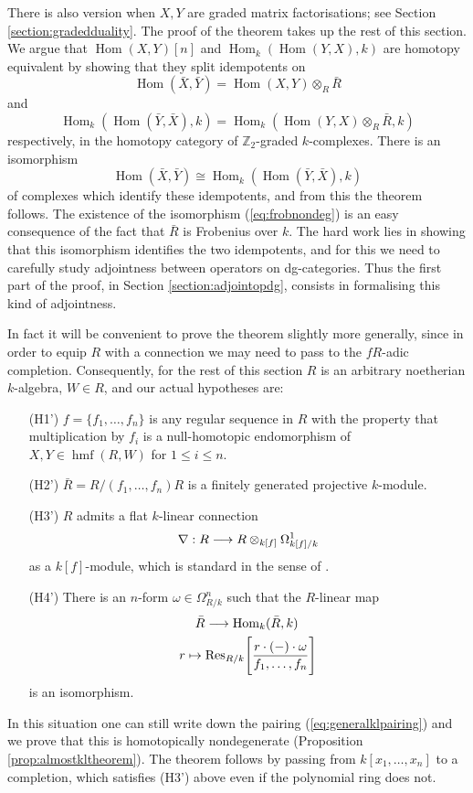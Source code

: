\documentclass{compositio}
\theoremstyle{definition}
\numberwithin{equation}{section}
\newcommand{\Ress}[1]{\res_{#1}\!}
\def\res{\operatorname{Res}}
\def\Hom{\operatorname{Hom}}
\DeclareMathOperator{\hmf}{hmf}
\begin{document}
There is also version when $X,Y$ are graded matrix factorisations; see Section \ref{section:gradedduality}. The proof of the theorem takes up the rest of this section. We argue that $\Hom(X,Y)[n]$ and $\Hom_k(\Hom(Y,X),k)$ are homotopy equivalent by showing that they split idempotents on
\[
\Hom(\bar{X},\bar{Y}) = \Hom(X,Y) \otimes_R \bar{R}
\]
and
\[
\Hom_k( \Hom(\bar{Y}, \bar{X}), k) = \Hom_k( \Hom(Y,X) \otimes_R \bar{R}, k )
\]
respectively, in the homotopy category of $\mathbb{Z}_2$-graded $k$-complexes. There is an isomorphism
\begin{equation}\label{eq:frobnondeg}
\Hom(\bar{X}, \bar{Y}) \cong \Hom_k( \Hom(\bar{Y}, \bar{X}), k)
\end{equation}
of complexes which identify these idempotents, and from this the theorem follows. The existence of the isomorphism (\ref{eq:frobnondeg}) is an easy consequence of the fact that $\bar{R}$ is Frobenius over $k$. The hard work lies in showing that this isomorphism identifies the two idempotents, and for this we need to carefully study adjointness between operators on dg-categories. Thus the first part of the proof, in Section \ref{section:adjointopdg}, consists in formalising this kind of adjointness.

In fact it will be convenient to prove the theorem slightly more generally, since in order to equip $R$ with a connection we may need to pass to the $fR$-adic completion. Consequently, for the rest of this section $R$ is an arbitrary noetherian $k$-algebra, $W \in R$, and our actual hypotheses are:
\begin{itemize}
\item[(H1')] $f = \{ f_1,\ldots,f_n \}$ is any regular sequence in $R$ with the property that multiplication by $f_i$ is a null-homotopic endomorphism of $X,Y \in \hmf(R,W)$ for $1 \le i \le n$.
\item[(H2')] $\bar{R} = R/(f_1,\ldots,f_n)R$ is a finitely generated projective $k$-module.
\item[(H3')] $R$ admits a flat $k$-linear connection
\[
\nabla: R \longrightarrow R \otimes_{k[f]} \Omega^1_{k[f]/k}
\]
as a $k[f]$-module, which is standard in the sense of \cite{??}.
\item[(H4')] There is an $n$-form $\omega \in \Omega^n_{R/k}$ such that the $R$-linear map
\begin{gather*}
\bar{R} \lto \Hom_k( \bar{R}, k)\,\\
r \mapsto \Ress{R/k}\Bigg[ \frac{r \cdot (-) \cdot \omega}{ f_1, \ldots, f_n} \Bigg]
\end{gather*}
is an isomorphism.
\end{itemize}
In this situation one can still write down the pairing (\ref{eq:generalklpairing}) and we prove that this is homotopically nondegenerate (Proposition \ref{prop:almostkltheorem}). The theorem follows by passing from $k[x_1,\ldots,x_n]$ to a completion, which satisfies (H3') above even if the polynomial ring does not.
\end{document}
